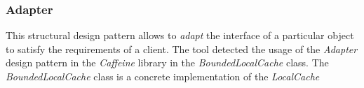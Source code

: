\subsubsection{Adapter}

This structural design pattern allows to \textit{adapt} the interface of a particular object to satisfy the requirements of a client. The tool detected the usage of the \textit{Adapter} design pattern in the \textit{Caffeine} library in the \textit{BoundedLocalCache} class. The \textit{BoundedLocalCache} class is a concrete implementation of the \textit{LocalCache}
